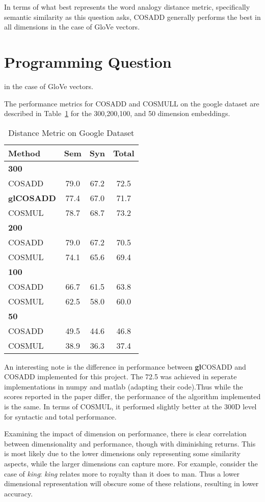 \documentclass{article}
\begin{document}
In terms of what best represents the word analogy distance metric, specifically
semantic similarity as this question asks, COSADD generally performs the best in
all dimensions in the case of GloVe vectors.


\section{Programming Question} in the case of GloVe vectors.

The performance metrics for COSADD and COSMULL on the google dataset are
described in Table~\ref{google} for the 300,200,100, and 50 dimension embeddings.

\begin{table}[ht]
  \centering
  \caption{Distance Metric on Google Dataset}
  \label{google}
\begin{tabular}{|l||c|c|c|}
  \hline
  Method & Sem & Syn & Total \\
  \hline
  \bf{300} & & & \\
  \hline
  COSADD & 79.0 & 67.2 & 72.5\\
  \bf{gl}COSADD & 77.4  & 67.0 & 71.7  \\
  COSMUL & 78.7 & 68.7 & 73.2 \\
  \hline
  \bf{200}& & &\\
  \hline
  COSADD & 79.0 & 67.2 & 70.5\\
  COSMUL & 74.1 & 65.6 & 69.4\\
  \hline
  \bf{100}& & &\\
  \hline
  COSADD & 66.7 & 61.5 & 63.8\\
  COSMUL & 62.5 & 58.0 & 60.0 \\
  \hline
  \bf{50}& & &\\
  \hline
  COSADD & 49.5 & 44.6 & 46.8\\
  COSMUL & 38.9 & 36.3 & 37.4 \\
  \hline
\end{tabular}
\end{table}

An interesting note is the difference in performance between {\bf gl}COSADD and
COSADD implemented for this project. The 72.5 was achieved in seperate
implementations in numpy and matlab (adapting their code).Thus while the
scores reported in the paper differ, the performance of the algorithm
implemented is the same. In terms of COSMUL, it performed slightly better at the
300D level for syntactic and total performance.

Examining the impact of dimension on performance, there is clear correlation
between dimensionality and performance, though with diminishing returns. This is most likely due to the lower
dimensions only representing some similarity aspects, while the larger dimensions
can capture more. For example, consider the case of \textit{king}: \textit{king}
relates more to royalty than it does to man. Thus a lower dimensional
representation will obscure some of these relations, resulting in lower accuracy.
\end{document}
